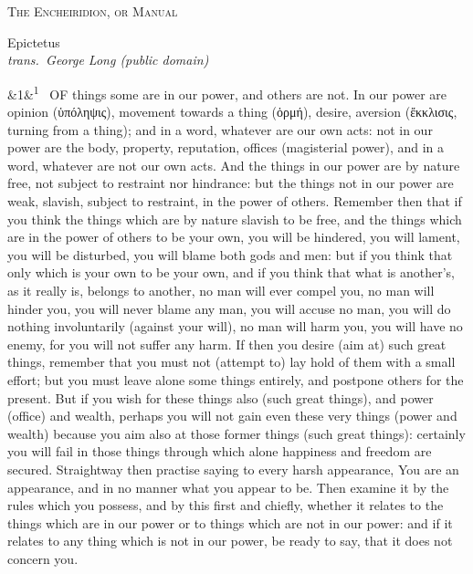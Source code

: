 \documentclass[12pt]{article}
\newcommand{\work}[1]{\begin{center}\LARGE\scshape #1\end{center}}
\newcommand{\attrib}[2]{\begin{center}\large #1\\[2pt]\small\itshape trans.\ #2\end{center}\vspace{1em}}
\newcommand{\para}[1][]{\par\noindent\ifx&#1&\else\textsuperscript{\footnotesize #1}~\fi}
\begin{document}
\work{The Encheiridion, or Manual}

\attrib{Epictetus}{George Long (public domain)}

\para[1] OF things some are in our power, and others are not. In our power are opinion (ὑπόληψις), movement towards a thing (ὁρμή), desire, aversion (ἔκκλισις, turning from a thing); and in a word, whatever are our own acts: not in our power are the body, property, reputation, offices (magisterial power), and in a word, whatever are not our own acts. And the things in our power are by nature free, not subject to restraint nor hindrance: but the things not in our power are weak, slavish, subject to restraint, in the power of others. Remember then that if you think the things which are by nature slavish to be free, and the things which are in the power of others to be your own, you will be hindered, you will lament, you will be disturbed, you will blame both gods and men: but if you think that only which is your own to be your own, and if you think that what is another's, as it really is, belongs to another, no man will ever compel you, no man will hinder you, you will never blame any man, you will accuse no man, you will do nothing involuntarily (against your will), no man will harm you, you will have no enemy, for you will not suffer any harm. If then you desire (aim at) such great things, remember that you must not (attempt to) lay hold of them with a small effort; but you must leave alone some things entirely, and postpone others for the present. But if you wish for these things also (such great things), and power (office) and wealth, perhaps you will not gain even these very things (power and wealth) because you aim also at those former things (such great things): certainly you will fail in those things through which alone happiness and freedom are secured. Straightway then practise saying to every harsh appearance, You are an appearance, and in no manner what you appear to be. Then examine it by the rules which you possess, and by this first and chiefly, whether it relates to the things which are in our power or to things which are not in our power: and if it relates to any thing which is not in our power, be ready to say, that it does not concern you.
\end{document}
